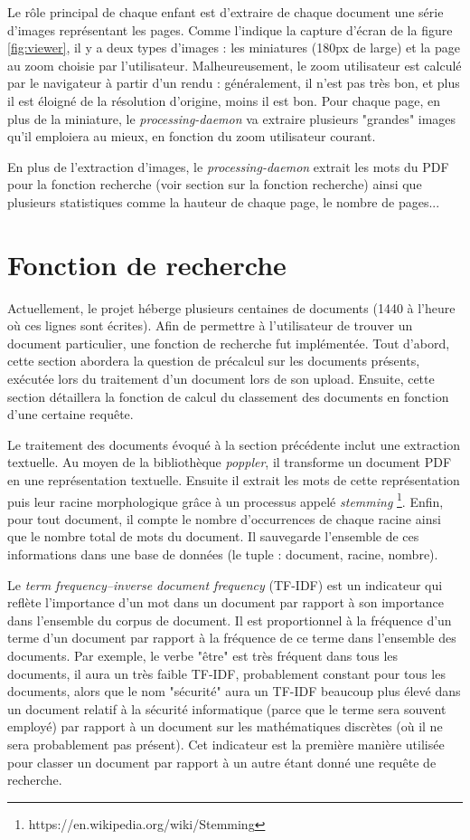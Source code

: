 \documentclass[a4paper,12pt]{article}
\begin{document}
Le rôle principal de chaque enfant est d'extraire de chaque document une série
d'images représentant les pages. Comme l'indique la capture d'écran de la figure \ref{fig:viewer},
il y a deux types d'images : les miniatures (180px de large) et la page au zoom 
choisie par l'utilisateur. Malheureusement, le zoom utilisateur est calculé par
le navigateur à partir d'un rendu : généralement, il n'est pas très bon, et plus il
est éloigné de la résolution d'origine, moins il est bon. Pour chaque page, en
plus de la miniature, le \textit{processing-daemon} va extraire plusieurs "grandes"
images qu'il emploiera au mieux, en fonction du zoom utilisateur courant.

En plus de l'extraction d'images, le \textit{processing-daemon} extrait les mots
du PDF pour la fonction recherche (voir section sur la fonction recherche) ainsi que
plusieurs statistiques comme la hauteur de chaque page, le nombre de pages...


\section{Fonction de recherche}

Actuellement, le projet héberge plusieurs centaines de documents (1440 à l'heure où ces lignes sont écrites).
Afin de permettre à l'utilisateur de trouver un document particulier, une
fonction de recherche fut implémentée. Tout d'abord, cette section abordera
la question de précalcul sur les documents présents, exécutée lors
du traitement d'un document lors de son upload. Ensuite, cette section
détaillera la fonction de calcul du classement des documents en fonction
d'une certaine requête.

Le traitement des documents évoqué à la section précédente inclut une extraction
textuelle. Au moyen de la bibliothèque \textit{poppler}, il transforme un document
PDF en une représentation textuelle. Ensuite il extrait les mots de cette représentation
puis leur racine morphologique grâce à un processus appelé \textit{stemming}
\footnote{https://en.wikipedia.org/wiki/Stemming}. Enfin, pour tout document,
il compte le nombre d'occurrences de chaque racine ainsi que le nombre total de mots du document.
Il sauvegarde l'ensemble de ces informations dans une base de données (le tuple : document, racine, nombre).

Le \textit{term frequency–inverse document frequency} (TF-IDF) est un indicateur
qui reflète l'importance d'un mot dans un document par rapport à son importance
dans l'ensemble du corpus de document. Il est proportionnel à la fréquence d'un terme
d'un document par rapport à la fréquence de ce terme dans l'ensemble des documents.
Par exemple, le verbe "être" est très fréquent dans tous les documents, il aura
un très faible TF-IDF, probablement constant pour tous les documents,
alors que le nom "sécurité" aura un TF-IDF beaucoup plus élevé dans un document
relatif à la sécurité informatique (parce que le terme sera souvent employé)
par rapport à un document sur les mathématiques discrètes (où il ne sera probablement
pas présent). Cet indicateur est la première manière utilisée pour classer
un document par rapport à un autre étant donné une requête de recherche.
\end{document}

